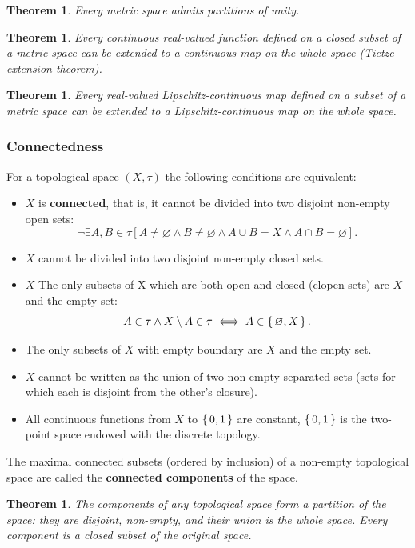 \documentclass[12pt, letterpaper]{article}
\renewcommand{\emptyset}{\varnothing}
\newtheorem{thm}[prop]{Theorem}
\theoremstyle{definition}
\theoremstyle{remark}
\theoremstyle{definition}
\theoremstyle{plain}
\numberwithin{equation}{section}
\begin{document}
	\begin{thm}
		Every metric space admits partitions of unity.
	\end{thm}

	\begin{thm}
		Every continuous real-valued function defined on a closed subset of a metric space can be extended to a continuous map on the whole space (Tietze extension theorem).
	\end{thm}

	\begin{thm}
		Every real-valued Lipschitz-continuous map defined on a subset of a metric space can be extended to a Lipschitz-continuous map on the whole space.
	\end{thm}

	\subsubsection{Connectedness}
	
	\begin{def*}
		For a topological space $(X,\tau)$ the following conditions are equivalent:
		\begin{itemize}
			\item $X$ is \textbf{connected}, that is, it cannot be divided into two disjoint non-empty open sets:
			\[\neg\exists A,B\in\tau[A\ne\emptyset\land B\ne\emptyset \land A\cup B=X\land A\cap B =\emptyset ]. \]
			\item $X$ cannot be divided into two disjoint non-empty closed sets.
			\item $X$ The only subsets of X which are both open and closed (clopen sets) are $X$ and the empty set:
			\[ A\in\tau\land X\setminus A\in\tau \iff A \in\set{\emptyset,X}. \]
			\item The only subsets of $X$ with empty boundary are $X$ and the empty set.
			\item $X$ cannot be written as the union of two non-empty separated sets
			(sets for which each is disjoint from the other's closure).
			\item All continuous functions from $X$ to $\set{0,1}$ are constant,
			$\set{0,1}$ is the two-point space endowed with the discrete topology.
		\end{itemize}
	\end{def*}

	\begin{def*}
		The maximal connected subsets (ordered by inclusion) of a non-empty topological space are called the \textbf{connected components} of the space.
	\end{def*}
	\begin{thm}
		The components of any topological space form a partition of the space: they are disjoint, non-empty, and their union is the whole space. Every component is a closed subset of the original space. 
	\end{thm}
\end{document}
